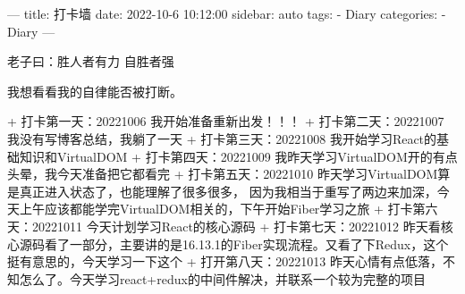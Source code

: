 ---
title: 打卡墙
date: 2022-10-6 10:12:00
sidebar: auto
tags:
 - Diary
categories:
 -  Diary
---

老子曰：胜人者有力 自胜者强

我想看看我的自律能否被打断。

+ 打卡第一天：20221006 我开始准备重新出发！！！
+ 打卡第二天：20221007 我没有写博客总结，我躺了一天
+ 打卡第三天：20221008 我开始学习React的基础知识和VirtualDOM
+ 打卡第四天：20221009 我昨天学习VirtualDOM开的有点头晕，我今天准备把它都看完
+ 打卡第五天：20221010 昨天学习VirtualDOM算是真正进入状态了，也能理解了很多很多，
  因为我相当于重写了两边来加深，今天上午应该都能学完VirtualDOM相关的，下午开始Fiber学习之旅
+ 打卡第六天：20221011 今天计划学习React的核心源码
+ 打卡第七天：20221012 昨天看核心源码看了一部分，主要讲的是16.13.1的Fiber实现流程。又看了下Redux，这个挺有意思的，今天学习一下这个
+ 打开第八天：20221013 昨天心情有点低落，不知怎么了。今天学习react+redux的中间件解决，并联系一个较为完整的项目
